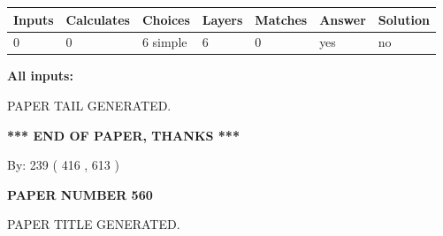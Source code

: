 \documentclass{ctexart}
\begin{document}
 
   
   
   
   
\noindent\begin{tabular}{|l|l|l|l|l|l|l|}
 \hline
Inputs & Calculates & Choices & Layers & Matches & Answer & Solution \\ \hline
 0  & 
 0  & 
 6
  simple  
  & 
 6  & 
 0  & 
  yes & 
  no 
  \\ \hline
 \end{tabular}
   
   
   
   
\noindent{}
   
   
   
   
\noindent\vspace{0.1in}\hspace{-0.08in} {\textbf{\Large{All inputs: }}}
   
   
   
   
   
   
 \vspace{0.2in}
 
   
   
\vspace{2.0in} PAPER TAIL GENERATED.
   
   
   
   
\vspace{1.0in} 
{\textbf{\large{ *** END OF PAPER, THANKS *** }}} 
   
   
\hspace{1.0in} By: 
 239 ( 416 ,  613 )
   
   
   
   
\newpage 
\setcounter{page}{ 
   560001 } 
   
   
   
   
 {\textbf{ \Large{ PAPER NUMBER  560  }}}
   
   
\vspace{0.2in}
   
   
   
   
   
   
   
   
 \vspace{0.2in}
 
 
 
 
   
   
 PAPER TITLE GENERATED.
   
\end{document}
